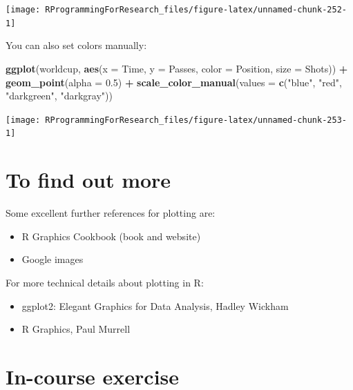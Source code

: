 \documentclass[]{book}
\makeatletter
\newenvironment{Shaded}{\begin{snugshade}}{\end{snugshade}}
\newcommand{\KeywordTok}[1]{\textcolor[rgb]{0.13,0.29,0.53}{\textbf{#1}}}
\newcommand{\DataTypeTok}[1]{\textcolor[rgb]{0.13,0.29,0.53}{#1}}
\newcommand{\FloatTok}[1]{\textcolor[rgb]{0.00,0.00,0.81}{#1}}
\newcommand{\StringTok}[1]{\textcolor[rgb]{0.31,0.60,0.02}{#1}}
\newcommand{\OperatorTok}[1]{\textcolor[rgb]{0.81,0.36,0.00}{\textbf{#1}}}
\newcommand{\NormalTok}[1]{#1}
\providecommand{\tightlist}{%
  \setlength{\itemsep}{0pt}\setlength{\parskip}{0pt}}
\newenvironment{kframe}{%
\medskip{}
\setlength{\fboxsep}{.8em}
 \def\at@end@of@kframe{}%
 \ifinner\ifhmode%
  \def\at@end@of@kframe{\end{minipage}}%
  \begin{minipage}{\columnwidth}%
 \fi\fi%
 \def\FrameCommand##1{\hskip\@totalleftmargin \hskip-\fboxsep
 \colorbox{shadecolor}{##1}\hskip-\fboxsep
     \hskip-\linewidth \hskip-\@totalleftmargin \hskip\columnwidth}%
 \MakeFramed {\advance\hsize-\width
   \@totalleftmargin\z@ \linewidth\hsize
   \@setminipage}}%
 {\par\unskip\endMakeFramed%
 \at@end@of@kframe}
\renewenvironment{Shaded}{\begin{kframe}}{\end{kframe}}
\theoremstyle{definition}
\theoremstyle{definition}
\theoremstyle{definition}
\theoremstyle{remark}
\makeatother
\begin{document}
\begin{center}\texttt{[image: RProgrammingForResearch\_files/figure-latex/unnamed-chunk-252-1]} \end{center}

You can also set colors manually:

\begin{Shaded}
\begin{Highlighting}[]
\KeywordTok{ggplot}\NormalTok{(worldcup, }\KeywordTok{aes}\NormalTok{(}\DataTypeTok{x =}\NormalTok{ Time, }\DataTypeTok{y =}\NormalTok{ Passes,}
                     \DataTypeTok{color =}\NormalTok{ Position, }\DataTypeTok{size =}\NormalTok{ Shots)) }\OperatorTok{+}\StringTok{ }
\StringTok{  }\KeywordTok{geom_point}\NormalTok{(}\DataTypeTok{alpha =} \FloatTok{0.5}\NormalTok{) }\OperatorTok{+}\StringTok{ }
\StringTok{  }\KeywordTok{scale_color_manual}\NormalTok{(}\DataTypeTok{values =} \KeywordTok{c}\NormalTok{(}\StringTok{"blue"}\NormalTok{, }\StringTok{"red"}\NormalTok{, }
                                \StringTok{"darkgreen"}\NormalTok{, }\StringTok{"darkgray"}\NormalTok{))}
\end{Highlighting}
\end{Shaded}

\begin{center}\texttt{[image: RProgrammingForResearch\_files/figure-latex/unnamed-chunk-253-1]} \end{center}

\section{To find out more}\label{to-find-out-more}

Some excellent further references for plotting are:

\begin{itemize}
\tightlist
\item
  R Graphics Cookbook (book and website)
\item
  Google images
\end{itemize}

For more technical details about plotting in R:

\begin{itemize}
\tightlist
\item
  ggplot2: Elegant Graphics for Data Analysis, Hadley Wickham
\item
  R Graphics, Paul Murrell
\end{itemize}

\section{In-course exercise}\label{in-course-exercise-3}
\end{document}
